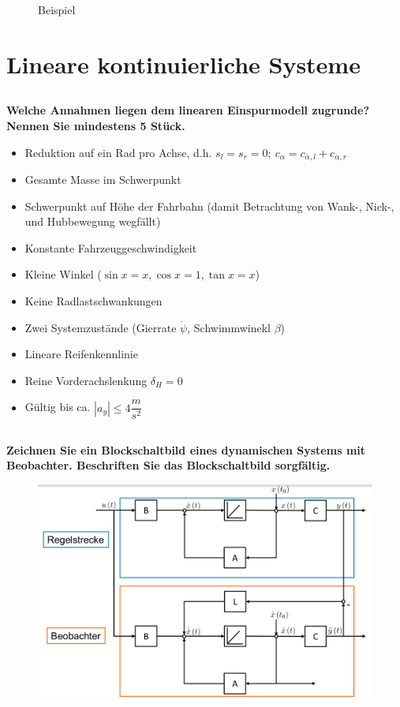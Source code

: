 \begin{figure}[H]
\begin{minipage}{.48\linewidth}
        \caption{Beispiel}
    \end{minipage}
\end{figure}

\section{Lineare kontinuierliche Systeme}
\subsection{}
\textbf{Welche Annahmen liegen dem linearen Einspurmodell zugrunde? Nennen Sie mindestens 5 Stück.}
\begin{itemize}
    \item Reduktion auf ein Rad pro Achse, d.h. $s_l=s_r=0;\ c_{\alpha}=c_{\alpha,l}+c_{\alpha,r}$
    \item Gesamte Masse im Schwerpunkt
    \item Schwerpunkt auf Höhe der Fahrbahn (damit Betrachtung von Wank-, Nick-, und Hubbewegung wegfällt)
    \item Konstante Fahrzeuggeschwindigkeit
    \item Kleine Winkel ($\sin x=x, \cos x=1, \tan x=x$)
    \item Keine Radlastschwankungen
    \item Zwei Systemzustände (Gierrate $\dot{\psi}$, Schwimmwinekl $\beta$)
    \item Lineare Reifenkennlinie
    \item Reine Vorderachslenkung $\delta_H=0$
    \item Gültig bis ca. $|a_y|\leq4\dfrac{m}{s^2}$
\end{itemize}

\subsection{}
\textbf{Zeichnen Sie ein Blockschaltbild eines dynamischen Systems mit Beobachter. Beschriften Sie das Blockschaltbild sorgfältig.}
\begin{figure}[H]
    \centering
    \includegraphics[width=.5\linewidth]{Graphics/beobrachter_blockbild.png}
\end{figure}
